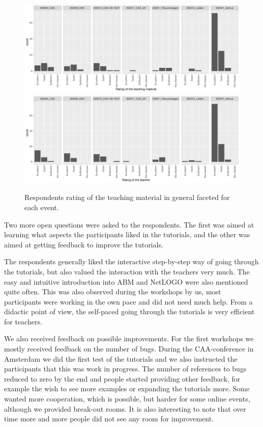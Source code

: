 \documentclass[
]{article}
\begin{document}
\begin{figure}
\includegraphics[height=0.5\textheight]{paper_files/figure-latex/rating-teaching-1} \includegraphics[height=0.5\textheight]{paper_files/figure-latex/rating-teaching-2} \caption{Respondents rating of the teaching material in general faceted for each event.}\label{fig:rating-teaching}
\end{figure}

Two more open questions were asked to the respondents. The first was aimed at learning what aspects the participants liked in the tutorials, and the other was aimed at getting feedback to improve the tutorials.

The respondents generally liked the interactive step-by-step way of going through the tutorials, but also valued the interaction with the teachers very much. The easy and intuitive introduction into ABM and NetLOGO were also mentioned quite often. This was also observed during the workshops by us, most participants were working in the own pace and did not need much help. From a didactic point of view, the self-paced going through the tutorials is very efficient for teachers.

We also received feedback on possible improvements. For the first workshops we mostly received feedback on the number of bugs. During the CAA-conference in Amsterdam we did the first test of the tutorials and we also instructed the participants that this was work in progress. The number of references to bugs reduced to zero by the end and people started providing other feedback, for example the wish to see more examples or expanding the tutorials more. Some wanted more cooperation, which is possible, but harder for some online events, although we provided break-out rooms. It is also interesting to note that over time more and more people did not see any room for improvement.
\end{document}
